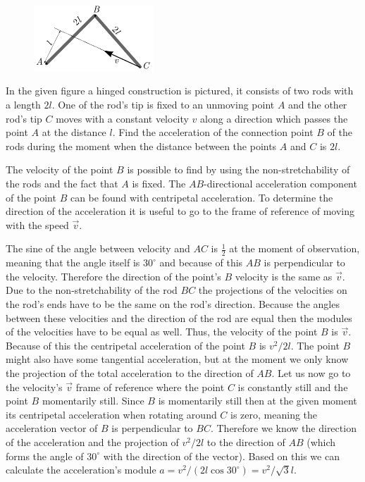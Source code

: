 \begin{figure}
	\vspace{-10pt}
	\includegraphics[width = 0.4\textwidth]  {2017-lahg-10-delta.pdf}
\end{figure}
In the given figure a hinged construction is pictured, it consists of two rods with a length $2l$. One of the rod’s tip is fixed to an unmoving point $A$ and the other rod’s tip $C$ moves with a constant velocity $v$ along a direction which passes the point $A$ at the distance $l$. Find the acceleration of the connection point $B$ of the rods during the moment when the distance between the points $A$ and $C$ is $2l$.

\hinteng
The velocity of the point $B$ is possible to find by using the non-stretchability of the rods and the fact that $A$ is fixed. The $AB$-directional acceleration component of the point $B$ can be found with centripetal acceleration. To determine the direction of the acceleration it is useful to go to the frame of reference of moving with the speed $\vec{v}$.

\solueng
The sine of the angle between velocity and $AC$ is $\frac 12$ at the moment of observation, meaning that the angle itself is $30^\circ$ and because of this $AB$ is perpendicular to the velocity. Therefore the direction of the point’s $B$ velocity is the same as $\vec v$. Due to the non-stretchability of the rod $BC$ the projections of the velocities on the rod’s ends have to be the same on the rod’s direction. Because the angles between these velocities and the direction of the rod are equal then the modules of the velocities have to be equal as well. Thus, the velocity of the point $B$ is $\vec v$. Because of this the centripetal acceleration of the point $B$ is $v^2/2l$. The point $B$ might also have some tangential acceleration, but at the moment we only know the projection of the total acceleration to the direction of $AB$. Let us now go to the velocity’s $\vec v$ frame of reference where the point $C$ is constantly still and the point $B$ momentarily still. Since $B$ is momentarily still then at the given moment its centripetal acceleration when rotating around $C$ is zero, meaning the acceleration vector of $B$ is perpendicular to $BC$. Therefore we know the direction of the acceleration and the projection of $v^2/2l$ to the direction of $AB$ (which forms the angle of $30^\circ$ with the direction of the vector). Based on this we can calculate the acceleration’s module $a=v^2/(2l\cos30^\circ)=v^2/\sqrt 3l$.
\probend